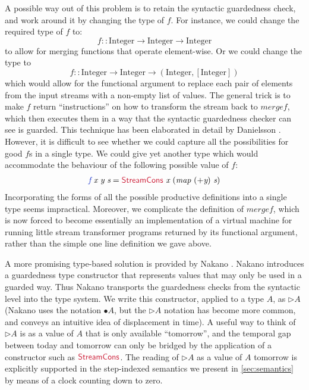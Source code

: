 \documentclass[natbib]{sigplanconf}
\newcommand{\cons}[1]{\textcolor{cons}{\textsf{#1}}}
\newcommand{\tyname}[1]{\textrm{#1}}
\newcommand{\ident}[1]{\textit{#1}}
\newcommand{\defn}[1]{\textcolor{defnd}{\ident{#1}}}
\begin{document}
A possible way out of this problem is to retain the syntactic
guardedness check, and work around it by changing the type of
$\ident{f}$. For instance, we could change the required type of
$\ident{f}$ to:
\begin{displaymath}
  \ident{f} :: \tyname{Integer} \to \tyname{Integer} \to \tyname{Integer}
\end{displaymath}
to allow for merging functions that operate element-wise. Or we could
change the type to
\begin{displaymath}
  \ident{f} :: \tyname{Integer} \to \tyname{Integer} \to (\tyname{Integer}, [\tyname{Integer}])
\end{displaymath}
which would allow for the functional argument to replace each pair of
elements from the input streams with a non-empty list of values. The
general trick is to make $\ident{f}$ return ``instructions'' on how to
transform the stream back to $\ident{mergef}$, which then executes
them in a way that the syntactic guardedness checker can see is
guarded. This technique has been elaborated in detail by Danielsson
\cite{danielsson10beating}. However, it is difficult to see whether we
could capture all the possibilities for good $\ident{f}$s in a single
type. We could give yet another type which would accommodate the
behaviour of the following possible value of $\ident{f}$:
\begin{displaymath}
  \begin{array}{l}
    \defn{f}\ \ident{x}\ \ident{y}\ \ident{s} = \cons{StreamCons}\ \ident{x}\ (\ident{map}\ (+\ident{y})\ \ident{s})
  \end{array}
\end{displaymath}
Incorporating the forms of all the possible productive definitions
into a single type seems impractical. Moreover, we complicate the
definition of $\ident{mergef}$, which is now forced to become
essentially an implementation of a virtual machine for running little
stream transformer programs returned by its functional argument,
rather than the simple one line definition we gave above.

A more promising type-based solution is provided by Nakano
\cite{nakano00modality}. Nakano introduces a guardedness type
constructor that represents values that may only be used in a guarded
way. Thus Nakano transports the guardedness checks from the syntactic
level into the type system. We write this constructor, applied to a
type $A$, as $\rhd A$ (Nakano uses the notation $\bullet A$, but the
$\rhd A$ notation has become more common, and conveys an intuitive
idea of displacement in time). A useful way to think of $\rhd A$ is as a
value of $A$ that is only available ``tomorrow'', and the temporal gap
between today and tomorrow can only be bridged by the application of a
constructor such as $\cons{StreamCons}$. The reading of $\rhd A$ as a
value of $A$ tomorrow is explicitly supported in the step-indexed
semantics we present in \autoref{sec:semantics} by means of a clock
counting down to zero.
\end{document}
